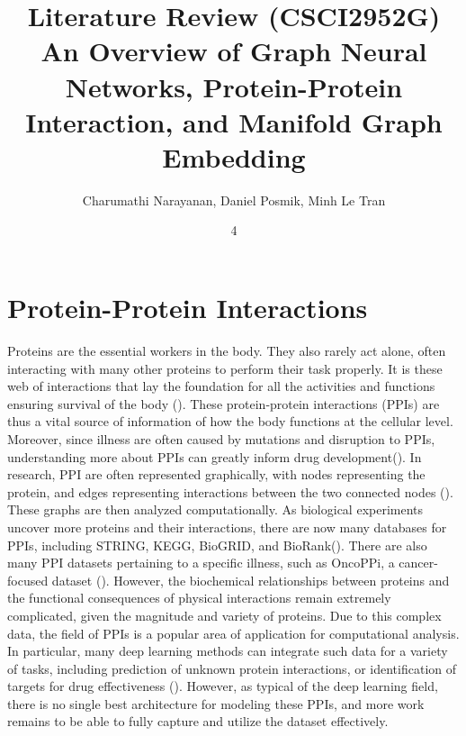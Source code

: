 \documentclass[twoside,11pt]{article}
\begin{document}
\title{	Literature Review (CSCI2952G) \\
\vspace{.1in}
An Overview of Graph Neural Networks, Protein-Protein Interaction, and Manifold Graph Embedding 	
}

\author{Charumathi Narayanan, Daniel Posmik, Minh Le Tran}

\maketitle
\date{4 }

\section{Protein-Protein Interactions} 
\label{sec:Intor}
Proteins are the essential workers in the body. They also rarely act alone, often interacting with many other proteins to perform their task properly. It is these web of interactions that lay the foundation for all the activities and functions ensuring survival of the body (\citet{PPI_hist}). These protein-protein interactions (PPIs) are thus a vital source of information of how the body functions at the cellular level. Moreover, since illness are often caused by mutations and disruption to PPIs, understanding more about PPIs can greatly inform drug development(\citet{PPI_disease}). In research, PPI are often represented graphically, with nodes representing the protein, and edges representing interactions between the two connected nodes (\citet{PPI_methods}). These graphs are then analyzed computationally. As biological experiments uncover more proteins and their interactions, there are now many databases for PPIs, including STRING, KEGG, BioGRID, and BioRank(\citet{PPI_methods}). There are also many PPI datasets pertaining to a specific illness, such as OncoPPi, a cancer-focused dataset (\citet{OncoPPi}). However, the biochemical relationships between proteins and the functional consequences of physical interactions remain extremely complicated, given the magnitude and variety of proteins. Due to this complex data, the field of PPIs is a popular area of application for computational analysis. In particular, many deep learning methods can integrate such data for a variety of tasks, including prediction of unknown protein interactions, or identification of targets for drug effectiveness (\citet{PPI_DL}). However, as typical of the deep learning field, there is no single best architecture for modeling these PPIs, and more work remains to be able to fully capture and utilize the dataset effectively. 
\end{document}
